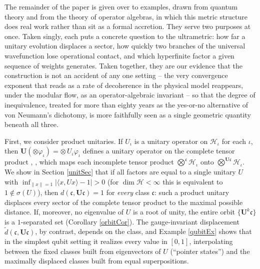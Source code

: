 \documentclass[twoside,11pt,letter]{article}
\def\cH{{\mathcal{H}}}
\def\fc{{\mathfrak{c}}}
\theoremstyle{definition}
\theoremstyle{definition}
\theoremstyle{plain}
\begin{document}
The remainder of the paper is given over to examples, drawn from quantum theory and from the theory of operator algebras, in which this metric structure does real work rather than sit as a formal accretion. They serve two purposes at once. Taken singly, each puts a concrete question to the ultrametric: how far a unitary evolution displaces a sector, how quickly two branches of the universal wavefunction lose operational contact, and which hyperfinite factor a given sequence of weights generates. Taken together, they are our evidence that the construction is not an accident of any one setting -- the very convergence exponent that reads as a rate of decoherence in the physical model reappears, under the modular flow, as an operator-algebraic invariant -- so that the degree of inequivalence, treated for more than eighty years as the yes-or-no alternative of von Neumann's dichotomy, is more faithfully seen as a single geometric quantity beneath all three.

First, we consider product unitaries. If $U_\iota$ is a unitary operator on $\cH_\iota$ for each $\iota$, then $\mathbf{U}(\otimes\varphi_\iota)=\otimes\, U_\iota\varphi_\iota$ defines a unitary operator on the complete tensor product \cite{vN39}, \cite{N70}, which maps each incomplete tensor product $\bigotimes^\fc\cH_\iota$ onto $\bigotimes^{\mathbf{U}\fc}\cH_\iota$. We show in Section \ref{unitSec} that if all factors are equal to a single unitary $U$ with $\inf_{\|x\|=1}|\langle x,Ux\rangle-1|>0$ (for $\dim\cH<\infty$ this is equivalent to $1\notin\sigma(U)$), then $d(\fc,\mathbf{U}\fc)=1$ for \emph{every} class $\fc$: such a product unitary displaces every sector of the complete tensor product to the maximal possible distance. If, moreover, no eigenvalue of $U$ is a root of unity, the entire orbit $\{\mathbf{U}^k\fc\}$ is a $1$-separated set (Corollary \ref{orbitCor}). The gauge-invariant displacement $\tilde d(\fc,\mathbf{U}\fc)$, by contrast, depends on the class, and Example \ref{qubitEx} shows that in the simplest qubit setting it realizes every value in $[0,1]$, interpolating between the fixed classes built from eigenvectors of $U$ (``pointer states'') and the maximally displaced classes built from equal superpositions.
\end{document}
